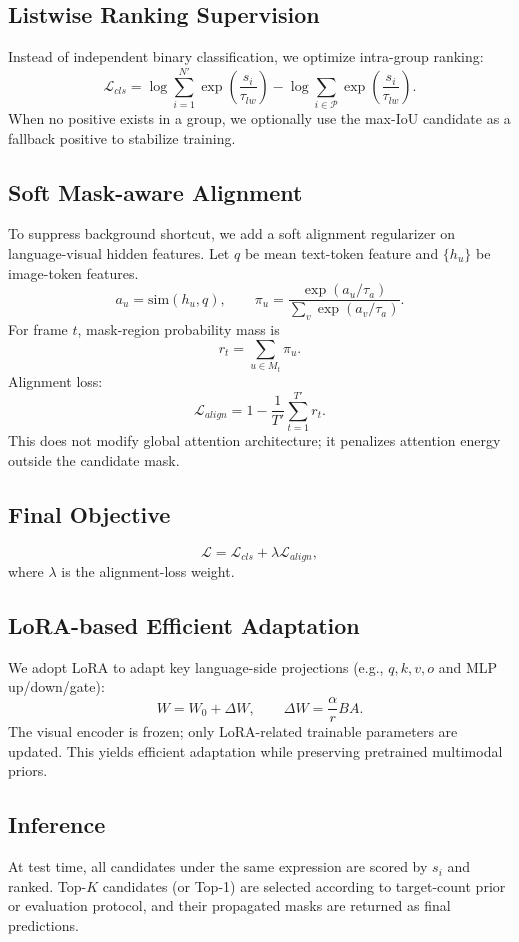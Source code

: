 \subsection{Listwise Ranking Supervision}
Instead of independent binary classification, we optimize intra-group ranking:
\[
\mathcal{L}_{cls}
=
\log\sum_{i=1}^{N'}\exp\left(\frac{s_i}{\tau_{lw}}\right)
-
\log\sum_{i\in\mathcal{P}}\exp\left(\frac{s_i}{\tau_{lw}}\right).
\]
When no positive exists in a group, we optionally use the max-IoU candidate as a fallback positive to stabilize training.

\subsection{Soft Mask-aware Alignment}
To suppress background shortcut, we add a soft alignment regularizer on language-visual hidden features.
Let $q$ be mean text-token feature and $\{h_u\}$ be image-token features.
\[
a_u=\mathrm{sim}(h_u,q),\qquad
\pi_u=\frac{\exp(a_u/\tau_a)}{\sum_v\exp(a_v/\tau_a)}.
\]
For frame $t$, mask-region probability mass is
\[
r_t=\sum_{u\in M_t}\pi_u.
\]
Alignment loss:
\[
\mathcal{L}_{align}=1-\frac{1}{T'}\sum_{t=1}^{T'}r_t.
\]
This does not modify global attention architecture; it penalizes attention energy outside the candidate mask.

\subsection{Final Objective}
\[
\mathcal{L}=\mathcal{L}_{cls}+\lambda\mathcal{L}_{align},
\]
where $\lambda$ is the alignment-loss weight.

\subsection{LoRA-based Efficient Adaptation}
We adopt LoRA to adapt key language-side projections (e.g., $q,k,v,o$ and MLP up/down/gate):
\[
W=W_0+\Delta W,\qquad
\Delta W=\frac{\alpha}{r}BA.
\]
The visual encoder is frozen; only LoRA-related trainable parameters are updated.
This yields efficient adaptation while preserving pretrained multimodal priors.

\subsection{Inference}
At test time, all candidates under the same expression are scored by $s_i$ and ranked. Top-$K$ candidates (or Top-1) are selected according to target-count prior or evaluation protocol, and their propagated masks are returned as final predictions.
